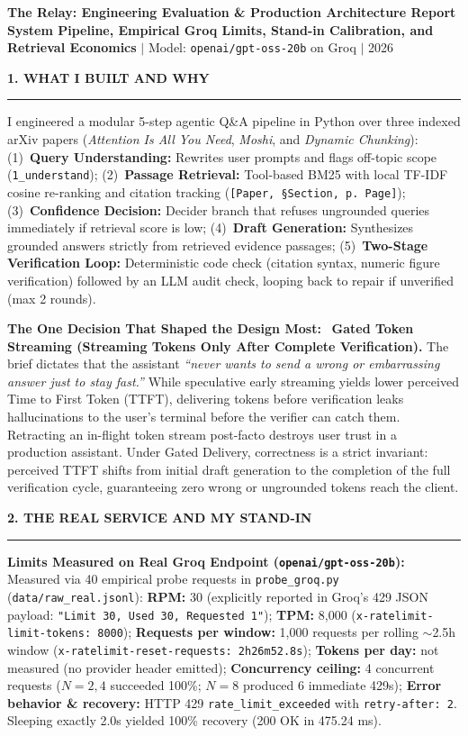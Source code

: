\documentclass[10pt,a4paper]{article}
\newcommand{\secheader}[1]{\vspace{0.2em}\noindent\textbf{\small\MakeUppercase{#1}}\vspace{0.05em}\par\hrule\vspace{0.12em}}
\newcommand{\subhead}[1]{\noindent\textbf{#1}\ }
\begin{document}
\fontsize{8.7pt}{10.3pt}\selectfont
\pagestyle{empty}

\begin{center}
    {\large \textbf{The Relay: Engineering Evaluation \& Production Architecture Report}}\\[0.1em]
    {\scriptsize \textbf{System Pipeline, Empirical Groq Limits, Stand-in Calibration, and Retrieval Economics} $|$ Model: \texttt{openai/gpt-oss-20b} on Groq $|$ 2026}
\end{center}
\vspace{-0.75em}

\secheader{1. What I Built and Why}
I engineered a modular 5-step agentic Q\&A pipeline in Python over three indexed arXiv papers (\textit{Attention Is All You Need}, \textit{Moshi}, and \textit{Dynamic Chunking}):
(1)~\textbf{Query Understanding:} Rewrites user prompts and flags off-topic scope (\texttt{1\_understand});
(2)~\textbf{Passage Retrieval:} Tool-based BM25 with local TF-IDF cosine re-ranking and citation tracking (\texttt{[Paper, \S Section, p. Page]});
(3)~\textbf{Confidence Decision:} Decider branch that refuses ungrounded queries immediately if retrieval score is low;
(4)~\textbf{Draft Generation:} Synthesizes grounded answers strictly from retrieved evidence passages;
(5)~\textbf{Two-Stage Verification Loop:} Deterministic code check (citation syntax, numeric figure verification) followed by an LLM audit check, looping back to repair if unverified (max 2 rounds).

\subhead{The One Decision That Shaped the Design Most:}
\textbf{Gated Token Streaming (Streaming Tokens Only After Complete Verification).} The brief dictates that the assistant \textit{``never wants to send a wrong or embarrassing answer just to stay fast.''} While speculative early streaming yields lower perceived Time to First Token (TTFT), delivering tokens before verification leaks hallucinations to the user's terminal before the verifier can catch them. Retracting an in-flight token stream post-facto destroys user trust in a production assistant. Under Gated Delivery, correctness is a strict invariant: perceived TTFT shifts from initial draft generation to the completion of the full verification cycle, guaranteeing zero wrong or ungrounded tokens reach the client.

\secheader{2. The Real Service and My Stand-in}
\subhead{Limits Measured on Real Groq Endpoint (\texttt{openai/gpt-oss-20b}):}
Measured via 40 empirical probe requests in \texttt{probe\_groq.py} (\texttt{data/raw\_real.jsonl}):
\textbf{RPM:} 30 (explicitly reported in Groq's 429 JSON payload: \texttt{"Limit 30, Used 30, Requested 1"});
\textbf{TPM:} 8,000 (\texttt{x-ratelimit-limit-tokens: 8000});
\textbf{Requests per window:} 1,000 requests per rolling $\sim$2.5h window (\texttt{x-ratelimit-reset-requests: 2h26m52.8s});
\textbf{Tokens per day:} not measured (no provider header emitted);
\textbf{Concurrency ceiling:} 4 concurrent requests ($N=2, 4$ succeeded 100\%; $N=8$ produced 6 immediate 429s);
\textbf{Error behavior \& recovery:} HTTP 429 \texttt{rate\_limit\_exceeded} with \texttt{retry-after: 2}. Sleeping exactly 2.0s yielded 100\% recovery (200 OK in 475.24 ms).
\end{document}
